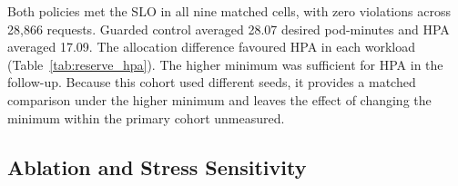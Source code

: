 \documentclass[10pt,twocolumn,a4paper]{article}
\begin{document}
\begin{table}[t]\centering\small\setlength{\tabcolsep}{3pt}
\caption{Separate exploratory cohort with both adaptive policies initialized at eight and constrained to the same minimum eight and maximum sixteen. Three fresh paired repeats per workload; the frozen primary cohort is unchanged.}\label{tab:reserve_hpa}
\ifdim\wd\databox>\textwidth\relax\resizebox{\textwidth}{!}{\usebox{\databox}}\else\usebox{\databox}\fi
\end{table}

Both policies met the SLO in all nine matched cells, with zero violations across 28,866 requests. Guarded control averaged 28.07 desired pod-minutes and HPA averaged 17.09. The allocation difference favoured HPA in each workload (Table~\ref{tab:reserve_hpa}). The higher minimum was sufficient for HPA in the follow-up. Because this cohort used different seeds, it provides a matched comparison under the higher minimum and leaves the effect of changing the minimum within the primary cohort unmeasured.

\subsection{Ablation and Stress Sensitivity}

\begin{table}[t]\centering\small\setlength{\tabcolsep}{3pt}
\caption{Live reserve ablation: guarded minus otherwise identical policy without the eight-replica floor. Both begin with eight ready replicas.}\label{tab:ablation}
\ifdim\wd\databox>\columnwidth\relax\resizebox{\columnwidth}{!}{\usebox{\databox}}\else\usebox{\databox}\fi
\end{table}
\end{document}
